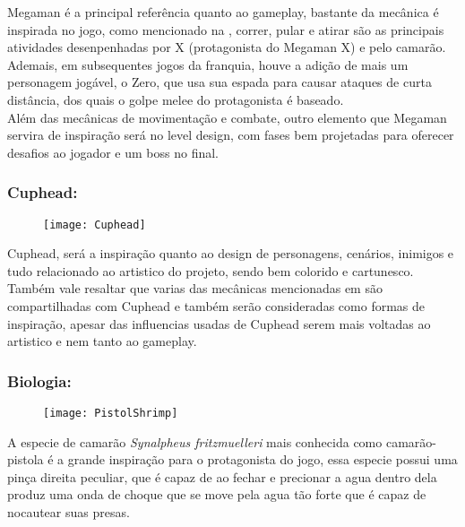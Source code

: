         Megaman é a principal referência quanto ao gameplay, bastante da mecânica é inspirada no jogo, como mencionado na , correr, pular e atirar são as principais atividades desenpenhadas por X (protagonista do Megaman X) e pelo camarão. Ademais, em subsequentes jogos da franquia, houve a adição de mais um personagem jogável, o Zero, que usa sua espada para causar ataques de curta distância, dos quais o golpe melee do protagonista é baseado.\\
        Além das mecânicas de movimentação e combate, outro elemento que Megaman servira de inspiração será no level design, com fases bem projetadas para oferecer desafios ao jogador e um boss no final.\\

        \subsubsection{Cuphead:}
            \begin{figure}[H]
                \texttt{[image: Cuphead]}
            \centering
            \end{figure}

            Cuphead, será a inspiração quanto ao design de personagens, cenários, inimigos e tudo relacionado ao artistico do projeto, sendo bem colorido e cartunesco.\\
            Também vale resaltar que varias das mecânicas mencionadas em  são compartilhadas com Cuphead e também serão consideradas como formas de inspiração, apesar das influencias usadas de Cuphead serem mais voltadas ao artistico e nem tanto ao gameplay.\\

        \subsubsection{Biologia:}
            \begin{figure}[H]
                \texttt{[image: PistolShrimp]}
            \centering
            \end{figure}

            A especie de camarão \textit{Synalpheus fritzmuelleri} mais conhecida como camarão-pistola é a grande inspiração para o protagonista do jogo, essa especie possui uma pinça direita peculiar, que é capaz de ao fechar e precionar a agua dentro dela produz uma onda de choque que se move pela agua tão forte que é capaz de nocautear suas presas.
 
